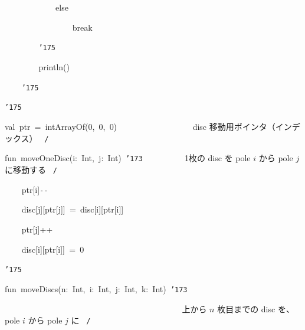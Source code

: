 \documentclass[a4paper,10pt]{article}
\def\mc{\relax}
\begin{document}
\noindent
\mbox{}{\tt\mc \ }{\tt\mc \ }{\tt\mc \ }{\tt\mc \ }{\tt\mc \ }{\tt\mc \ }{\tt\mc \ }{\tt\mc \ }{\tt\mc \ }{\tt\mc \ }{\tt\mc \ }{\tt\mc \ }else

\noindent
\mbox{}{\tt\mc \ }{\tt\mc \ }{\tt\mc \ }{\tt\mc \ }{\tt\mc \ }{\tt\mc \ }{\tt\mc \ }{\tt\mc \ }{\tt\mc \ }{\tt\mc \ }{\tt\mc \ }{\tt\mc \ }{\tt\mc \ }{\tt\mc \ }{\tt\mc \ }{\tt\mc \ }break

\noindent
\mbox{}{\tt\mc \ }{\tt\mc \ }{\tt\mc \ }{\tt\mc \ }{\tt\mc \ }{\tt\mc \ }{\tt\mc \ }{\tt\mc \ }{\tt\char'175}

\noindent
\mbox{}{\tt\mc \ }{\tt\mc \ }{\tt\mc \ }{\tt\mc \ }{\tt\mc \ }{\tt\mc \ }{\tt\mc \ }{\tt\mc \ }println()

\noindent
\mbox{}{\tt\mc \ }{\tt\mc \ }{\tt\mc \ }{\tt\mc \ }{\tt\char'175}

\noindent
\mbox{}{\tt\char'175}

\noindent
\mbox{}\hfill

\noindent
\mbox{}val{\tt\mc \ }ptr{\tt\mc \ }={\tt\mc \ }intArrayOf(0,{\tt\mc \ }0,{\tt\mc \ }0){\tt\mc \ \ \ \ \ \ \ \ }{\tt\mc \ \ \ \ \ \ \ \ }\rm\mc {\tt /}{\tt *}\  \ disc 移動用ポインタ（インデックス）
					   \hfill \rm\mc \ {\tt *}{\tt /}
\tt\mc 

\noindent
\mbox{}\hfill

\noindent
\mbox{}fun{\tt\mc \ }moveOneDisc(i:{\tt\mc \ }Int,{\tt\mc \ }j:{\tt\mc \ }Int){\tt\mc \ }{\tt\char'173}{\tt\mc \ \ \ \ \ \ \ \ }\rm\mc {\tt /}{\tt *}\  \ 1枚の disc を pole $i$ から
					   pole $j$ に移動する \hfill \rm\mc \ {\tt *}{\tt /}
\tt\mc 

\noindent
\mbox{}{\tt\mc \ }{\tt\mc \ }{\tt\mc \ }{\tt\mc \ }ptr[i]{\tt -}{\tt -}

\noindent
\mbox{}{\tt\mc \ }{\tt\mc \ }{\tt\mc \ }{\tt\mc \ }disc[j][ptr[j]]{\tt\mc \ }={\tt\mc \ }disc[i][ptr[i]]

\noindent
\mbox{}{\tt\mc \ }{\tt\mc \ }{\tt\mc \ }{\tt\mc \ }ptr[j]++

\noindent
\mbox{}{\tt\mc \ }{\tt\mc \ }{\tt\mc \ }{\tt\mc \ }disc[i][ptr[i]]{\tt\mc \ }={\tt\mc \ }0

\noindent
\mbox{}{\tt\char'175}

\noindent
\mbox{}\hfill

\noindent
\mbox{}fun{\tt\mc \ }moveDiscs(n:{\tt\mc \ }Int,{\tt\mc \ }i:{\tt\mc \ }Int,{\tt\mc \ }j:{\tt\mc \ }Int,{\tt\mc \ }k:{\tt\mc \ }Int){\tt\mc \ }{\tt\char'173}

\noindent
\mbox{}{\tt\mc \ \ \ \ \ \ \ \ }{\tt\mc \ \ \ \ \ \ \ \ }{\tt\mc \ \ \ \ \ \ \ \ }{\tt\mc \ \ \ \ \ \ \ \ }{\tt\mc \ \ \ \ \ \ \ \ }\rm\mc {\tt /}{\tt *}\  \ 上から $n$ 枚目までの disc
					   を、pole $i$ から pole $j$ に
					   \hfill \rm\mc \ {\tt *}{\tt /}
\tt\mc 
\end{document}
